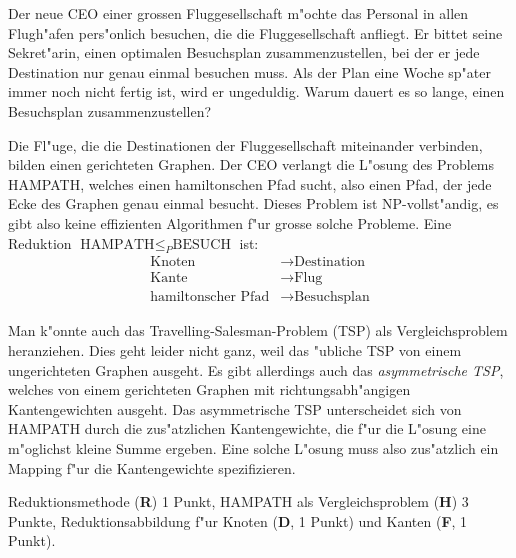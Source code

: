Der neue CEO einer grossen Fluggesellschaft m"ochte das Personal in allen
Flugh"afen pers"onlich besuchen, die die Fluggesellschaft anfliegt.
Er bittet seine Sekret"arin, einen optimalen Besuchsplan zusammenzustellen,
bei der er jede Destination nur genau einmal besuchen muss.
Als der Plan eine Woche sp"ater immer noch nicht fertig ist, wird er
ungeduldig.
Warum dauert es so lange, einen Besuchsplan zusammenzustellen?

\begin{loesung}
Die Fl"uge, die die Destinationen der Fluggesellschaft miteinander
verbinden, bilden einen gerichteten Graphen.
Der CEO verlangt die L"osung des Problems HAMPATH, welches einen
hamiltonschen Pfad sucht, also einen Pfad, der jede Ecke des Graphen
genau einmal besucht.
Dieses Problem ist NP-vollst"andig, es gibt also keine effizienten
Algorithmen f"ur grosse solche Probleme.
Eine Reduktion $\text{HAMPATH}\le_P\text{BESUCH}$ ist:
\begin{align*}
\text{Knoten}    & \to \text{Destination}\\
\text{Kante}     & \to \text{Flug} \\
\text{hamiltonscher Pfad}&\to\text{Besuchsplan}
\end{align*}
\end{loesung}

\begin{diskussion}
Man k"onnte auch das Travelling-Salesman-Problem (TSP) als Vergleichsproblem
heranziehen.
Dies geht leider nicht ganz, weil das "ubliche TSP von einem ungerichteten
Graphen ausgeht.
Es gibt allerdings auch das {\em asymmetrische TSP}, welches von einem 
gerichteten Graphen mit richtungsabh"angigen Kantengewichten ausgeht.
Das asymmetrische TSP unterscheidet sich von HAMPATH durch die
zus"atzlichen Kantengewichte, die f"ur die L"osung eine m"oglichst
kleine Summe ergeben.
Eine solche L"osung muss also zus"atzlich ein Mapping f"ur die
Kantengewichte spezifizieren.
\end{diskussion}

\begin{bewertung}
Reduktionsmethode ({\bf R}) 1 Punkt,
HAMPATH als Vergleichsproblem ({\bf H}) 3 Punkte,
Reduktionsabbildung f"ur Knoten ({\bf D}, 1 Punkt) und Kanten
({\bf F}, 1 Punkt).
\end{bewertung}

